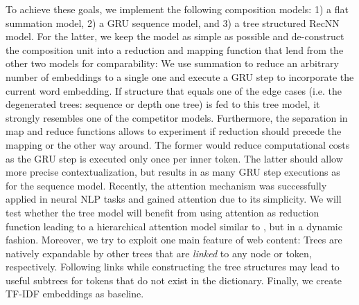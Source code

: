 To achieve these goals, we implement the following composition models: 1) a flat summation model, 2) a \ac{GRU} \autocite{cho_properties_2014} sequence model, and 3) a tree structured \ac{RecNN} model. For the latter, we keep the model as simple as possible and de-construct  the composition unit into a reduction and mapping function that lend from the other two models for comparability: We use summation to reduce an arbitrary number of embeddings to a single one and execute a \ac{GRU} step to incorporate the current word embedding. If structure that equals one of the edge cases (i.e. the degenerated trees: sequence or depth one tree) is fed to this tree model, it strongly resembles one of the competitor models. Furthermore, the separation in map and reduce functions allows to experiment if reduction should precede the mapping or the other way around. The former would reduce computational costs as the \ac{GRU} step is executed only once per inner token. The latter should allow more precise contextualization, but results in as many \ac{GRU} step executions as for the sequence model. Recently, the attention mechanism \autocite{bahdanau_neural_2014,xu_show_2015} was successfully applied in neural \ac{NLP} tasks \autocite{zhuang_neobility_2017,vaswani_attention_2017} and gained attention due to its simplicity. We will test whether the tree model will benefit from using attention as reduction function leading to a hierarchical attention model similar to \textcite{yang_hierarchical_2016}, but in a dynamic fashion. Moreover, we try to exploit one main feature of web content: Trees are natively expandable by other trees that are \textit{linked}  to any node or token, respectively. Following links while constructing the tree structures may lead to useful subtrees for tokens that do not exist in the dictionary. Finally, we create \ac{TF-IDF} embeddings as baseline. 

